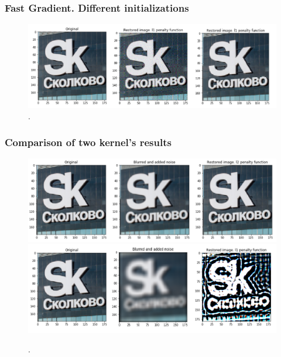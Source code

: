 \documentclass[hyperref={pdfpagelabels=false}]{beamer}
\begin{document}
\begin{frame}
\frametitle{Fast Gradient. Different initializations}

\begin{center}
\begin{figure}[h]
\begin{adjustwidth}{-0.8cm}{-0.5 cm}
\includegraphics[scale=0.35]{methods.png}
\end{adjustwidth}
\caption{.}
\end{figure}
\end{center}

\end{frame}
\begin{frame}
\frametitle{Comparison of two kernel's results}

\begin{center}
\begin{figure}[h]
\begin{adjustwidth}{-0.2cm}{-0.5 cm}
\includegraphics[scale=0.37]{grad_l2_small.png} \\
\includegraphics[scale=0.37]{grad_l1_big.png} \\
\end{adjustwidth}
\caption{.}
\end{figure}
\end{center}

\end{frame}
\end{document}
